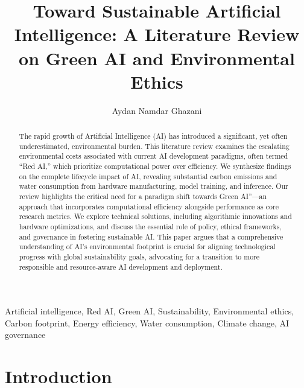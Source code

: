 \documentclass[twoside]{ai_ethics_class}
\begin{document}
\begin{frontmatter}
  \title{Toward Sustainable Artificial Intelligence: A Literature Review on Green AI and Environmental Ethics}
  \author{Aydan Namdar Ghazani}
  \address{11709245 \\ aydan.ghazani@tuwien.ac.at \\ AI Ethics}

  \begin{abstract}
The rapid growth of Artificial Intelligence (AI) has introduced a significant, yet often underestimated, environmental burden. This literature review examines the escalating environmental costs associated with current AI development paradigms, often termed ``Red AI,'' which prioritize computational power over efficiency. We synthesize findings on the complete lifecycle impact of AI, revealing substantial carbon emissions and water consumption from hardware manufacturing, model training, and inference. Our review highlights the critical need for a paradigm shift towards Green AI''—an approach that incorporates computational efficiency alongside performance as core research metrics. We explore technical solutions, including algorithmic innovations and hardware optimizations, and discuss the essential role of policy, ethical frameworks, and governance in fostering sustainable AI. This paper argues that a comprehensive understanding of AI's environmental footprint is crucial for aligning technological progress with global sustainability goals, advocating for a transition to more responsible and resource-aware AI development and deployment.
  \end{abstract}

  \begin{keyword}
  Artificial intelligence, Red AI, Green AI, Sustainability, Environmental ethics, Carbon footprint, Energy efficiency, Water consumption, Climate change, AI governance
  \end{keyword}
 \end{frontmatter}

\section{Introduction}

\end{document}
